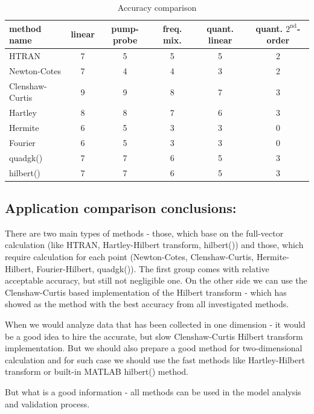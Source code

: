 \documentclass[12pt,twoside,a4paper]{article}
\numberwithin{equation}{subsection}
\numberwithin{figure}{subsection}
\begin{document}
\begin{table}
  \caption{Accuracy comparison} \label{gencom_accuracy} 
  \begin{tabular}{l | c | c | c | c | c}
    method name  &  linear  &  pump-probe  &  freq. mix.  &  quant. linear  &  quant. $2^{\text{nd}}$-order \\
    \hline
    HTRAN            &  7  &  5  &  5  &  5  &  2  \\
    Newton-Cotes     &  7  &  4  &  4  &  3  &  2  \\
    Clenshaw-Curtis  &  9  &  9  &  8  &  7  &  3  \\
    Hartley          &  8  &  8  &  7  &  6  &  3  \\
    Hermite          &  6  &  5  &  3  &  3  &  0  \\
    Fourier          &  6  &  5  &  3  &  3  &  0  \\
    quadgk()         &  7  &  7  &  6  &  5  &  3  \\
    hilbert()        &  7  &  7  &  6  &  5  &  3  \\
    \hline
  \end{tabular}
\end{table}


\subsection{Application comparison conclusions:} \label{chap:gencom_application}


There are two main types of methods - those, which base on the full-vector calculation (like HTRAN, Hartley-Hilbert
transform, hilbert()) and those, which require calculation for each point (Newton-Cotes, Clenshaw-Curtis, Hermite-Hilbert,
Fourier-Hilbert, quadgk()). The first group comes with relative acceptable accuracy, but still not negligible one. On the other
side we can use the Clenshaw-Curtis based implementation of the Hilbert transform - which has showed as the method with the
best accuracy from all investigated methods.

When we would analyze data that has been collected in one dimension - it would be a good idea to hire the accurate, but slow
Clenshaw-Curtis Hilbert transform implementation. But we should also prepare a good method for two-dimensional calculation and for
such case we should use the fast methods like Hartley-Hilbert transform or built-in MATLAB \textregistered hilbert() method.

But what is a good information - all methods can be used in the model analysis and validation process.
\end{document}
